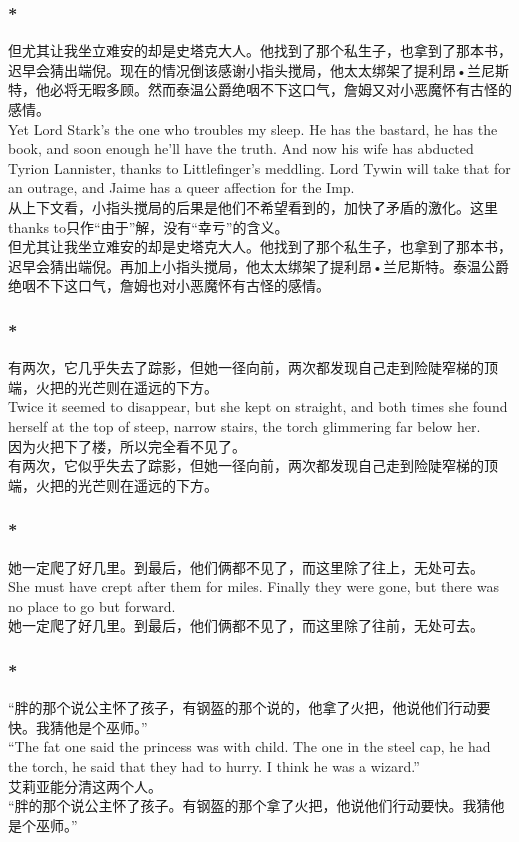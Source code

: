 \documentclass[12pt,a4paper]{article}
\newcommand{\h}[1]{{\color{red}#1}\\}
\newcommand{\la}[1]{{\color{blue}#1}\\}
\begin{document}
\subsubsection{\color{red}*}\la{
	但尤其让我坐立难安的却是史塔克大人。他找到了那个私生子，也拿到了那本书，迟早会猜出端倪。现在的情况倒该感谢小指头搅局，他太太绑架了提利昂•兰尼斯特，他必将无暇多顾。然而泰温公爵绝咽不下这口气，詹姆又对小恶魔怀有古怪的感情。\\
	Yet Lord Stark's the one who troubles my sleep. He has the bastard, he has the book, and soon enough he'll have the truth. And now his wife has abducted Tyrion Lannister, thanks to Littlefinger's meddling. Lord Tywin will take that for an outrage, and Jaime has a queer affection for the Imp.}\h{
	从上下文看，小指头搅局的后果是他们不希望看到的，加快了矛盾的激化。这里thanks to只作“由于”解，没有“幸亏”的含义。}
	但尤其让我坐立难安的却是史塔克大人。他找到了那个私生子，也拿到了那本书，迟早会猜出端倪。再加上小指头搅局，他太太绑架了提利昂•兰尼斯特。泰温公爵绝咽不下这口气，詹姆也对小恶魔怀有古怪的感情。
	
\subsubsection{\color{red}*}\la{
	有两次，它几乎失去了踪影，但她一径向前，两次都发现自己走到险陡窄梯的顶端，火把的光芒则在遥远的下方。\\
	Twice it seemed to disappear, but she kept on straight, and both times she found herself at the top of steep, narrow stairs, the torch glimmering far below her.}\h{
	因为火把下了楼，所以完全看不见了。}
	有两次，它似乎失去了踪影，但她一径向前，两次都发现自己走到险陡窄梯的顶端，火把的光芒则在遥远的下方。
	
\subsubsection{\color{red}*}\la{
	 她一定爬了好几里。到最后，他们俩都不见了，而这里除了往上，无处可去。\\
	 She must have crept after them for miles. Finally they were gone, but there was no place to go but forward.}
	 她一定爬了好几里。到最后，他们俩都不见了，而这里除了往前，无处可去。
\subsubsection{\color{red}*}\la{
	 “胖的那个说公主怀了孩子，有钢盔的那个说的，他拿了火把，他说他们行动要快。我猜他是个巫师。”\\
	 “The fat one said the princess was with child. The one in the steel cap, he had the torch, he said that they had to hurry. I think he was a wizard.”}\h{
	 艾莉亚能分清这两个人。}
	 “胖的那个说公主怀了孩子。有钢盔的那个拿了火把，他说他们行动要快。我猜他是个巫师。”
	 
\end{document}

